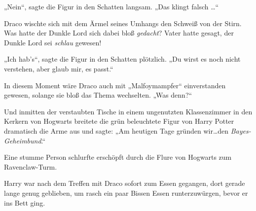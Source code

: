 „Nein“, sagte die Figur in den Schatten langsam. „Das klingt falsch …“

Draco wischte sich mit dem Ärmel seines Umhangs den Schweiß von der Stirn. Was hatte der Dunkle Lord sich dabei bloß \emph{gedacht}? Vater hatte gesagt, der Dunkle Lord sei \emph{schlau} gewesen!

„Ich hab’s“, sagte die Figur in den Schatten plötzlich. „Du wirst es noch nicht verstehen, aber glaub mir, es passt.“

In diesem Moment wäre Draco auch mit „Malfoymampfer“ einverstanden gewesen, solange sie bloß das Thema wechselten. „Was denn?“

Und inmitten der verstaubten Tische in einem ungenutzten Klassenzimmer in den Kerkern von Hogwarts breitete die grün beleuchtete Figur von Harry Potter dramatisch die Arme aus und sagte: „Am heutigen Tage gründen wir…den \emph{Bayes-Geheimbund}.“

\later

Eine stumme Person schlurfte erschöpft durch die Flure von Hogwarts zum Ravenclaw-Turm.

Harry war nach dem Treffen mit Draco sofort zum Essen gegangen, dort gerade lange genug geblieben, um rasch ein paar Bissen Essen runterzuwürgen, bevor er ins Bett ging.

